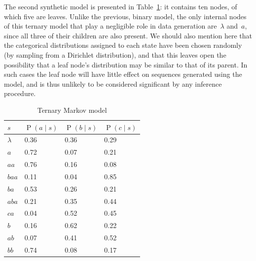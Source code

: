 \documentclass[11pt,a4paper]{article}
\DeclareMathOperator\Pb{P}                    %
\begin{document}
The second synthetic model is presented in Table~\ref{tab:ternary model}: it
contains ten nodes, of which five are leaves. Unlike the previous, binary model,
the only internal nodes of this ternary model that play a negligible role in
data generation are~\(\lambda\) and~\(a\), since all three of their children are
also present. We should also mention here that the categorical distributions
assigned to each state have been chosen randomly (by sampling from a Dirichlet
distribution), and that this leaves open the possibility that a leaf node's
distribution may be similar to that of its parent. In such cases the leaf node
will have little effect on sequences generated using the model, and is thus
unlikely to be considered significant by any inference procedure.
%
\begin{table}[htbp]
  \centering
  \begin{tabular}{llll}
    \toprule
    \(s\)       & \(\Pb(a \mid s)\) & \(\Pb(b \mid s)\) & \(\Pb(c \mid s)\) \\
    \midrule
    \(\lambda\) & 0.36 & 0.36 & 0.29 \\
    \(a\)       & 0.72 & 0.07 & 0.21 \\
    \(aa\)      & 0.76 & 0.16 & 0.08 \\
    \(baa\)     & 0.11 & 0.04 & 0.85 \\
    \(ba\)      & 0.53 & 0.26 & 0.21 \\
    \(aba\)     & 0.21 & 0.35 & 0.44 \\
    \(ca\)      & 0.04 & 0.52 & 0.45 \\
    \(b\)       & 0.16 & 0.62 & 0.22 \\
    \(ab\)      & 0.07 & 0.41 & 0.52 \\
    \(bb\)      & 0.74 & 0.08 & 0.17 \\
    \bottomrule
  \end{tabular}
  \caption{Ternary Markov model}\label{tab:ternary model}
  \end{table}
\end{document}
